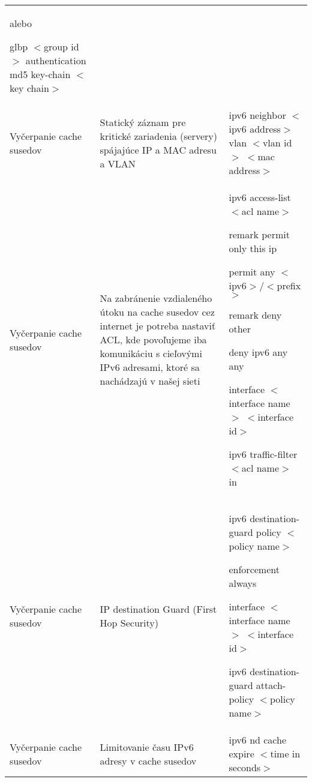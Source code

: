\begin{longtable}[!htbp]{|L{10em}L{10em}>{\selectfont}L{34em}|}
	\vspace{0.5em}
	{\selectfont alebo}
	\vspace{0.5em}
	
	\hspace{0.5em}glbp $<$group id$>$ authentication md5 key-chain $<$key chain$>$\\
	
	
	
	
	Vyčerpanie cache susedov	&Statický záznam pre kritické zariadenia (servery) spájajúce IP a MAC adresu a VLAN
	&ipv6 neighbor $<$ipv6 address$>$ vlan $<$vlan id$>$ $<$mac address$>$\\
	
	
	
	
	Vyčerpanie cache susedov	&Na zabránenie vzdialeného útoku na cache susedov cez internet je potreba nastaviť ACL, kde povoľujeme iba komunikáciu s cieľovými IPv6 adresami, ktoré sa nachádzajú v našej sieti	&ipv6 access-list $<$acl name$>$
	
	\hspace{0.5em}remark permit only this ip  
	
	\hspace{0.5em}permit any $<$ipv6$>$/$<$prefix$>$
	
	\hspace{0.5em}remark deny other
	
	\hspace{0.5em}deny ipv6 any any 
	
	interface $<$interface name$>$ $<$interface id$>$
	
	\hspace{0.5em}ipv6 traffic-filter $<$acl name$>$ in\\
	
	
	
	
	 Vyčerpanie cache susedov	&IP destination Guard (First Hop Security)
	
	
	&ipv6 destination-guard policy $<$policy name$>$
	
	\hspace{0.5em}enforcement always
	
	interface $<$interface name$>$ $<$interface id$>$
	
	\hspace{0.5em}ipv6 destination-guard attach-policy $<$policy name$>$\\
	
	

	
	
	
	 Vyčerpanie cache susedov	&Limitovanie času IPv6 adresy v cache susedov	&ipv6 nd cache expire $<$time in seconds$>$\\
	

\end{longtable}
